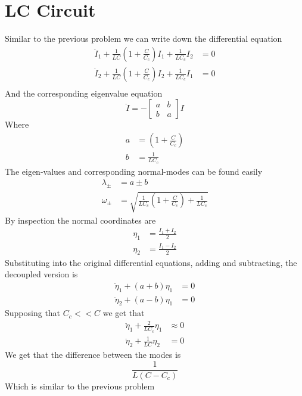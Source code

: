 \section{LC Circuit}
Similar to the previous problem we can write down the differential equation
\begin{equation}
    \begin{split}
        \ddot{I}_1+\frac{1}{LC}(1+\frac{C}{C_c})I_1+\frac{1}{LC_c}I_2 &=0\\
        \ddot{I}_2+\frac{1}{LC}(1+\frac{C}{C_c})I_2+\frac{1}{LC_c}I_1 &=0\\
    \end{split}
\end{equation}
And the corresponding eigenvalue equation
\begin{equation}
    \ddot{I} = -\begin{bmatrix}
        a & b \\
        b & a 
    \end{bmatrix}I
\end{equation}
Where
\begin{equation}
    \begin{split}
        a & = (1+\frac{C}{C_c})\\
        b & = \frac{1}{LC_c}
    \end{split}
\end{equation}
The eigen-values and corresponding normal-modes can be found easily
\begin{equation}
    \begin{split}
        \lambda_\pm & = a \pm b\\
        \omega_\pm & = \sqrt{\frac{1}{LC_c}(1+\frac{C}{C_c})+\frac{1}{LC_c}}
    \end{split}
\end{equation}
By inspection the normal coordinates are
\begin{equation}
    \begin{split}
        \eta_1 &= \frac{I_1 + I_2}{2}\\
        \eta_2 &= \frac{I_1-I_2}{2}
    \end{split}
\end{equation}
Substituting into the original differential equations, adding and subtracting, the decoupled version is
\begin{equation}
    \begin{split}
        \ddot{\eta}_1+(a+b)\eta_1 &=0\\
        \ddot{\eta}_2+(a-b)\eta_1 &= 0
    \end{split}
\end{equation}
Supposing that $C_c << C$ we get that
\begin{equation}
    \begin{split}
        \ddot{\eta}_1+\frac{2}{LC_c}\eta_1 &\approx 0\\
        \ddot{\eta}_2+\frac{1}{LC}\eta_2&=0
    \end{split}
\end{equation}
We get that the difference between the modes is
\begin{equation}
    \frac{1}{L(C-C_c)}
\end{equation}
Which is similar to the previous problem